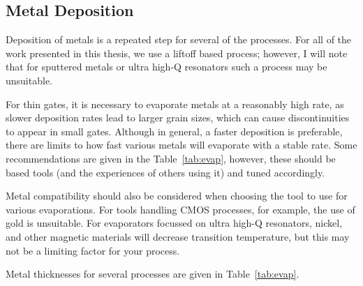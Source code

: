 \subsection{Metal Deposition}
\label{sec:metaldep}
Deposition of metals is a repeated step for several of the processes. For all of the work presented in this thesis, we use a
liftoff based process; however, I will note that for sputtered metals or ultra high-Q resonators such a process may be unsuitable.

For thin gates, it is necessary to evaporate metals at a reasonably high rate, as slower deposition rates lead to larger
grain sizes, which can cause discontinuities to appear in small gates. Although in general, a faster deposition is preferable,
there are limits to how fast various metals will evaporate with a stable rate. Some recommendations are given in the Table~\ref{tab:evap}, however,
these should be based tools (and the experiences of others using it) and tuned accordingly.

Metal compatibility should also be considered when choosing the tool to use for various evaporations. For tools handling CMOS processes,
for example, the use of gold is unsuitable. For evaporators focussed on ultra high-Q resonators, nickel, and other magnetic materials
will decrease transition temperature, but this may not be a limiting factor for your process.

Metal thicknesses for several processes are given in Table~\ref{tab:evap}.

